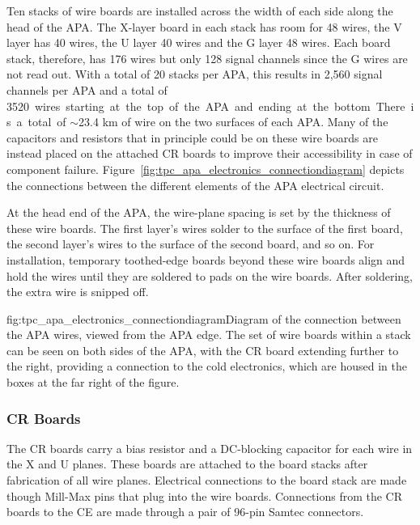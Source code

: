 Ten stacks of wire boards are installed across the width of each side along the head of the APA.  The X-layer board in each stack has room for 48 wires, the V layer has 40 wires, the U layer 40 wires and the G layer 48 wires.  Each board stack, therefore, has 176 wires but only 128 signal channels since the G wires are not read out.  
With a total of 20 stacks per APA, this results in 2,560 signal channels per APA and a total of \SI{3520} wires starting at the top of the APA and ending at the bottom.  There is a total of $\sim$23.4 km of wire on the two surfaces of each APA.  Many of the capacitors and resistors that in principle could be on these wire boards are instead
placed on the attached CR boards to improve their accessibility in case of component failure.   Figure~\ref{fig:tpc_apa_electronics_connectiondiagram} depicts the connections between the different elements of the APA electrical circuit. 

At the head end of the APA, the wire-plane spacing is set by the thickness of these wire boards.  The first layer's wires solder to the surface of the first board, the second layer's wires to the surface of the second board, and so on.  For installation, temporary toothed-edge boards beyond these wire boards align and hold the wires until they are soldered to pads on the wire boards.  After soldering, the extra wire is snipped off. 

\begin{dunefigure}{fig:tpc_apa_electronics_connectiondiagram}{Diagram of the connection between the APA wires, viewed from the APA edge. The set of wire boards within a stack can be seen on both sides of the APA, with the CR board extending further to the right, providing a connection to the cold electronics, which are housed in the boxes at the far right of the figure. }
\end{dunefigure}

\subsubsection{CR Boards}
\label{sec:crboards}

The CR boards carry a bias resistor and a DC-blocking capacitor for each wire in the X and U planes. These boards are attached to the board stacks after fabrication of all wire planes.  Electrical connections to the board stack are made though Mill-Max pins that plug into the wire boards. Connections from the CR boards to the CE are made through a pair of 96-pin Samtec connectors.

